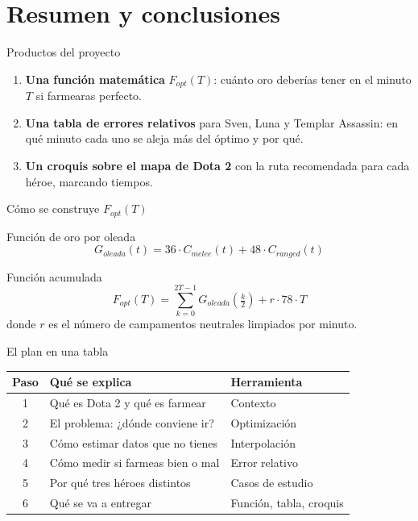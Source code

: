 \section{Resumen y conclusiones}

\begin{frame}{Productos del proyecto}
  \begin{enumerate}
    \item \textbf{Una función matemática} \(F_{opt}(T)\): cuánto oro deberías tener en el minuto \(T\) si farmearas perfecto.
    \item \textbf{Una tabla de errores relativos} para Sven, Luna y Templar Assassin: en qué minuto cada uno se aleja más del óptimo y por qué.
    \item \textbf{Un croquis sobre el mapa de Dota 2} con la ruta recomendada para cada héroe, marcando tiempos.
  \end{enumerate}
\end{frame}

\begin{frame}{Cómo se construye \(F_{opt}(T)\)}
  \begin{block}{Función de oro por oleada}
    \[
      G_{oleada}(t) = 36 \cdot C_{melee}(t) + 48 \cdot C_{ranged}(t)
    \]
  \end{block}
  \begin{block}{Función acumulada}
    \[
      F_{opt}(T) = \sum_{k=0}^{2T-1} G_{oleada}\!\left(\tfrac{k}{2}\right) + r \cdot 78 \cdot T
    \]
    donde \(r\) es el número de campamentos neutrales limpiados por minuto.
  \end{block}
\end{frame}

\begin{frame}{El plan en una tabla}
  \begin{center}
    \small
    \begin{tabular}{cp{6.5cm}p{4cm}}
      \toprule
      \textbf{Paso} & \textbf{Qué se explica} & \textbf{Herramienta} \\
      \midrule
      1 & Qué es Dota 2 y qué es farmear & Contexto \\
      2 & El problema: ¿dónde conviene ir? & Optimización \\
      3 & Cómo estimar datos que no tienes & Interpolación \\
      4 & Cómo medir si farmeas bien o mal & Error relativo \\
      5 & Por qué tres héroes distintos & Casos de estudio \\
      6 & Qué se va a entregar & Función, tabla, croquis \\
      \bottomrule
    \end{tabular}
  \end{center}
\end{frame}


